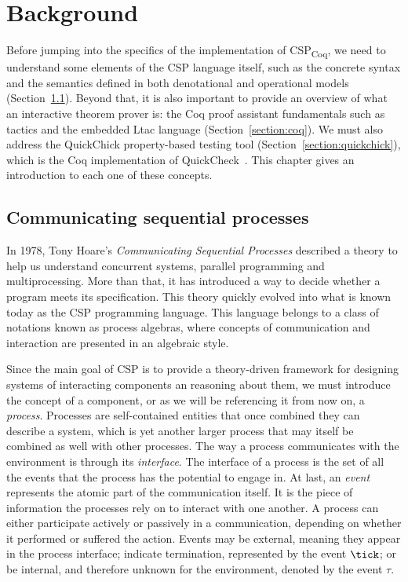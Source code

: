 \chapter{Background}
\label{chapter:background}

Before jumping into the specifics of the implementation of CSP\textsubscript{Coq}, we need to understand some elements of the CSP language itself, such as the concrete syntax and the semantics defined in both denotational and operational models (Section~\ref{section:csp}). Beyond that, it is also important to provide an overview of what an interactive theorem prover is: the Coq proof assistant fundamentals such as tactics and the embedded Ltac language (Section~\ref{section:coq}). We must also address the QuickChick property-based testing tool (Section~\ref{section:quickchick}), which is the Coq implementation of QuickCheck~\cite{hughes:quickcheck2000}. This chapter gives an introduction to each one of these concepts.

\section{Communicating sequential processes}
\label{section:csp}

In 1978, Tony Hoare's \emph{Communicating Sequential Processes} \cite{hoare:csp} described a theory to help us understand concurrent systems, parallel programming and multiprocessing. More than that, it has introduced a way to decide whether a program meets its specification. This theory quickly evolved into what is known today as the CSP programming language. This language belongs to a class of notations known as process algebras, where concepts of communication and interaction are presented in an algebraic style.

Since the main goal of CSP is to provide a theory-driven framework for designing systems of interacting components an reasoning about them, we must introduce the concept of a component, or as we will be referencing it from now on, a \emph{process}. Processes are self-contained entities that once combined they can describe a system, which is yet another larger process that may itself be combined as well with other processes. The way a process communicates with the environment is through its \emph{interface}. The interface of a process is the set of all the events that the process has the potential to engage in. At last, an \emph{event} represents the atomic part of the communication itself. It is the piece of information the processes rely on to interact with one another. A process can either participate actively or passively in a communication, depending on whether it performed or suffered the action. Events may be external, meaning they appear in the process interface; indicate termination, represented by the event $ \tick $; or be internal, and therefore unknown for the environment, denoted by the event $ \tau $.

